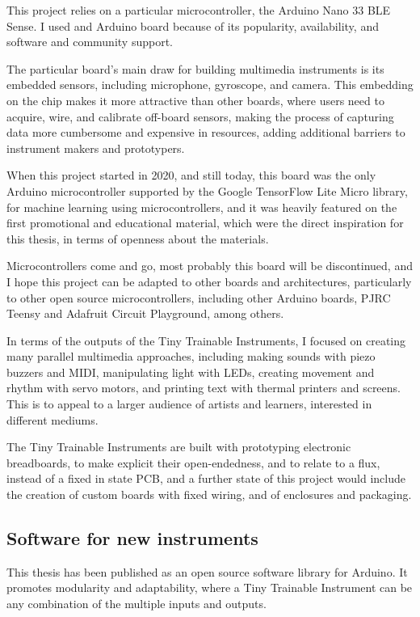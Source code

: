 This project relies on a particular microcontroller, the Arduino Nano 33 BLE Sense. I used and Arduino board because of its popularity, availability, and software and community support.

The particular board's main draw for building multimedia instruments is its embedded sensors, including microphone, gyroscope, and camera. This embedding on the chip makes it more attractive than other boards, where users need to acquire, wire, and calibrate off-board sensors, making the process of capturing data more cumbersome and expensive in resources, adding additional barriers to instrument makers and prototypers. 

When this project started in 2020, and still today, this board was the only Arduino microcontroller supported by the Google TensorFlow Lite Micro library, for machine learning using microcontrollers, and it was heavily featured on the first promotional and educational material, which were the direct inspiration for this thesis, in terms of openness about the materials.

Microcontrollers come and go, most probably this board will be discontinued, and I hope this project can be adapted to other boards and architectures, particularly to other open source microcontrollers, including other Arduino boards, PJRC Teensy and Adafruit Circuit Playground, among others.

In terms of the outputs of the Tiny Trainable Instruments, I focused on creating many parallel multimedia approaches, including making sounds with piezo buzzers and MIDI, manipulating light with LEDs, creating movement and rhythm with servo motors, and printing text with thermal printers and screens. This is to appeal to a larger audience of artists and learners, interested in different mediums.

The Tiny Trainable Instruments are built with prototyping electronic breadboards, to make explicit their open-endedness, and to relate to a flux, instead of a fixed in state PCB, and a further state of this project would include the creation of custom boards with fixed wiring, and of enclosures and packaging.


\subsection{Software for new instruments}

This thesis has been published as an open source software library for Arduino. It promotes modularity and adaptability, where a Tiny Trainable Instrument can be any combination of the multiple inputs and outputs.

